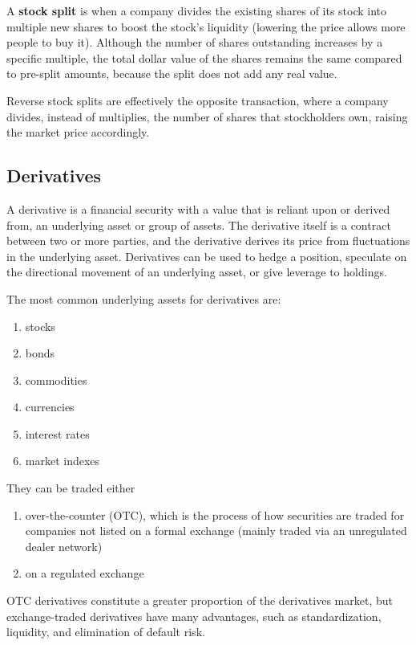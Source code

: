 \documentclass{article}
\begin{document}
    \begin{definition}
      A \textbf{stock split} is when a company divides the existing shares of its stock into multiple new shares to boost the stock's liquidity (lowering the price allows more people to buy it). Although the number of shares outstanding increases by a specific multiple, the total dollar value of the shares remains the same compared to pre-split amounts, because the split does not add any real value. 

      Reverse stock splits are effectively the opposite transaction, where a company divides, instead of multiplies, the number of shares that stockholders own, raising the market price accordingly. 
    \end{definition}

  \subsection{Derivatives}

    \begin{definition}[Derivatives]
      A derivative is a financial security with a value that is reliant upon or derived from, an underlying asset or group of assets. The derivative itself is a contract between two or more parties, and the derivative derives its price from fluctuations in the underlying asset. Derivatives can be used to hedge a position, speculate on the directional movement of an underlying asset, or give leverage to holdings. 

      The most common underlying assets for derivatives are: 
      \begin{enumerate}
        \item stocks
        \item bonds
        \item commodities
        \item currencies
        \item interest rates 
        \item market indexes 
      \end{enumerate}
      They can be traded either 
      \begin{enumerate}
          \item over-the-counter (OTC), which is the process of how securities are traded for companies not listed on a formal exchange (mainly traded via an unregulated dealer network)
          \item on a regulated exchange
      \end{enumerate}
      OTC derivatives constitute a greater proportion of the derivatives market, but exchange-traded derivatives have many advantages, such as standardization, liquidity, and elimination of default risk. 
    \end{definition}
\end{document}
